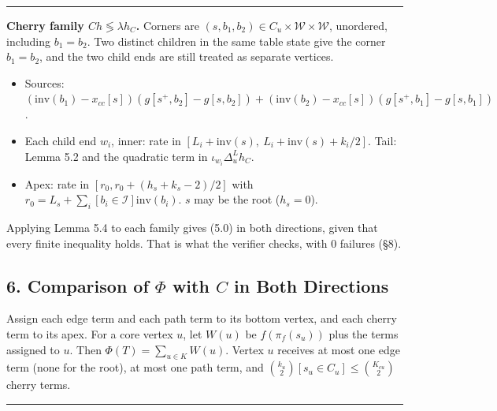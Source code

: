 \documentclass[11pt]{article}
\theoremstyle{remark}
\numberwithin{equation}{section}
\newenvironment{transcription}{\par\medskip\noindent\rule{\linewidth}{0.4pt}\par\nopagebreak}{\par\nopagebreak\noindent\rule{\linewidth}{0.4pt}\par\medskip}
\begin{document}
\begin{transcription}
\textbf{Cherry family $Ch \lessgtr \lambda h_C$.} Corners are $(s, b_1, b_2) \in C_u \times \mathcal{W} \times \mathcal{W}$, unordered, including $b_1 = b_2$. Two distinct children in the same table state give the corner $b_1 = b_2$, and the two child ends are still treated as separate vertices.
\begin{itemize}
\item Sources: $(\mathrm{inv}(b_1) - x_{cc}[s])(g[s^+, b_2] - g[s, b_2]) + (\mathrm{inv}(b_2) - x_{cc}[s])(g[s^+, b_1] - g[s, b_1])$.
\item Each child end $w_i$, inner: rate in $[L_i + \mathrm{inv}(s),\ L_i + \mathrm{inv}(s) + k_i/2]$. Tail: Lemma 5.2 and the quadratic term in $\iota_{w_i}\Delta^L_u h_C$.
\item Apex: rate in $[r_0, r_0 + (h_s + k_s - 2)/2]$ with $r_0 = L_s + \sum_i [b_i \in \mathcal{I}]\mathrm{inv}(b_i)$. $s$ may be the root ($h_s = 0$).
\end{itemize}

Applying Lemma 5.4 to each family gives (5.0) in both directions, given that every finite inequality holds. That is what the verifier checks, with 0 failures (\S{}8).


\subsection*{6. Comparison of $\Phi$ with $C$ in Both Directions}

Assign each edge term and each path term to its bottom vertex, and each cherry term to its apex. For a core vertex $u$, let $W(u)$ be $f(\pi_f(s_u))$ plus the terms assigned to $u$. Then $\Phi(T) = \sum_{u \in K} W(u)$. Vertex $u$ receives at most one edge term (none for the root), at most one path term, and $\binom{k_u}{2}[s_u \in C_u] \le \binom{K_{cu}}{2}$ cherry terms.


\end{transcription}
\end{document}
